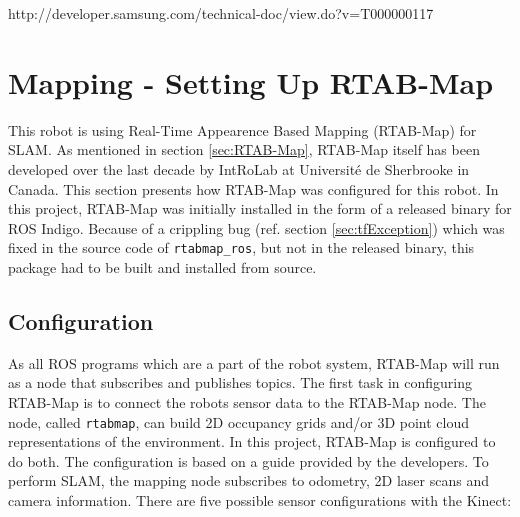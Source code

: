 http://developer.samsung.com/technical-doc/view.do?v=T000000117



\section{Mapping - Setting Up RTAB-Map}

This robot is using Real-Time Appearence Based Mapping (\ac{RTAB-Map}) for \ac{SLAM}. As mentioned in section \ref{sec:RTAB-Map}, \ac{RTAB-Map} itself has been developed over the last decade by IntRoLab at Université de Sherbrooke in Canada. This section presents how \ac{RTAB-Map} was configured for this robot. In this project, \ac{RTAB-Map} was initially installed in the form of a released binary for \ac{ROS} Indigo. Because of a crippling bug (ref. section \ref{sec:tfException}) which was fixed in the source code
of \texttt{rtabmap\_ros}, but not in the released binary, this package had to be built and installed from source.

\subsection{Configuration}
\label{sec:configuration}
As all \ac{ROS} programs which are a part of the robot system, \ac{RTAB-Map} will run as a node that subscribes and publishes topics. The first task in configuring \ac{RTAB-Map} is to connect the robots sensor data to the \ac{RTAB-Map} node. The node, called \texttt{rtabmap}, can build 2D occupancy grids and/or 3D point cloud representations of the environment. In this project, \ac{RTAB-Map} is configured to do both. The configuration is based on a guide\cite{rtabmap_setup} provided by the developers. To perform \ac{SLAM}, the mapping node subscribes to odometry, 2D laser scans and camera information. There are five possible sensor configurations with the Kinect\cite{rtabmap_setup}:

